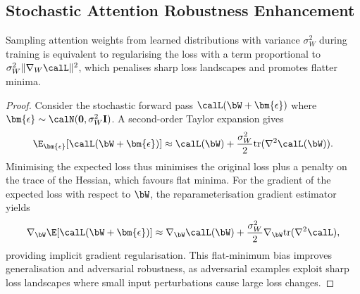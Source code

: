 \subsection{Stochastic Attention Robustness Enhancement}
\label{app:stoch_attention}

\begin{proposition}
Sampling attention weights from learned distributions with variance $\sigma_W^2$ during training is equivalent to regularising the loss with a term proportional to $\sigma_W^2\|\nabla_W\calL\|^2$, which penalises sharp loss landscapes and promotes flatter minima.
\end{proposition}

\begin{proof}
Consider the stochastic forward pass $\calL(\bW+\bm{\epsilon})$ where $\bm{\epsilon}\sim\calN(\mathbf{0},\sigma_W^2\mathbf{I})$. A second-order Taylor expansion gives
\begin{equation}
\E_{\bm{\epsilon}}[\calL(\bW+\bm{\epsilon})]
\approx \calL(\bW) + \frac{\sigma_W^2}{2}\mathrm{tr}(\nabla^2\calL(\bW)).
\end{equation}
Minimising the expected loss thus minimises the original loss plus a penalty on the trace of the Hessian, which favours flat minima. For the gradient of the expected loss with respect to $\bW$, the reparameterisation gradient estimator yields
\begin{equation}
\nabla_{\bW}\E[\calL(\bW+\bm{\epsilon})] \approx \nabla_{\bW}\calL(\bW) + \frac{\sigma_W^2}{2}\nabla_{\bW}\mathrm{tr}(\nabla^2\calL),
\end{equation}
providing implicit gradient regularisation. This flat-minimum bias improves generalisation and adversarial robustness, as adversarial examples exploit sharp loss landscapes where small input perturbations cause large loss changes.
\end{proof}
